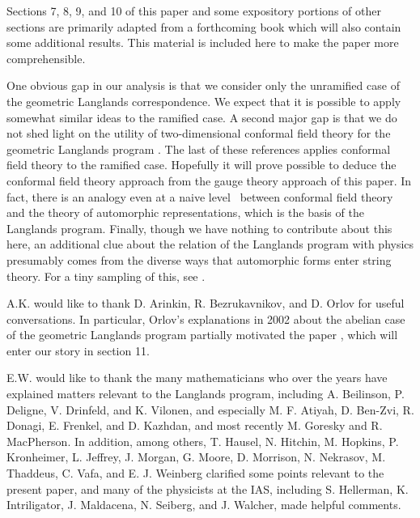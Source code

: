 Sections 7, 8, 9, and 10 of this paper and some expository
portions of other sections are primarily adapted from a
forthcoming book \cite{ref26} which will also contain
some additional results. This material is included here to make
the paper more comprehensible.

 
 

 

    

 
 
 One obvious gap in our analysis is
that we consider only the unramified case of the geometric
Langlands correspondence.  We expect that it is possible to apply
somewhat similar ideas to the ramified case.  A second major gap
is that we do not shed light on the utility of two-dimensional
conformal field theory for the geometric Langlands program
\cite{ref5,ref9,ref27,ref28,ref29,ref30}. The last of these
references applies conformal field theory to the ramified case.
Hopefully it will prove possible to deduce the conformal field
theory approach from the gauge theory approach of this paper. In
fact, there is an analogy even at a naive level \cite{ref31}\ between
conformal field theory and the theory of automorphic
representations, which is the basis of the Langlands program.
Finally, though we have nothing to contribute about this here, an
additional clue about the relation of the Langlands program with
physics presumably comes from the diverse ways that automorphic
forms enter string theory. For a tiny sampling of this, see
\cite{ref32,ref33,ref34,ref35,ref36,ref37,ref38,ref39,ref40}.

A.K. would like to thank D. Arinkin, R. Bezrukavnikov, and D.
Orlov for useful conversations. In particular, Orlov's
explanations in 2002 about the abelian case of the geometric
Langlands program partially motivated the paper \cite{ref41}, which will enter our story in section 11.

E.W. would like to thank the many mathematicians who over the
years have explained matters relevant to the Langlands program,
including A. Beilinson, P. Deligne,  V. Drinfeld,  and K. Vilonen,
and especially M. F. Atiyah,   D. Ben-Zvi, R. Donagi, E. Frenkel,
and D. Kazhdan, and most recently M. Goresky and R. MacPherson. In
addition, among others,  T. Hausel, N. Hitchin, M. Hopkins, P.
Kronheimer, L. Jeffrey,  J. Morgan, G. Moore, D. Morrison, N.
Nekrasov, M. Thaddeus, C. Vafa, and E. J. Weinberg clarified some
points relevant to the present paper, and many of the physicists
at the IAS, including S. Hellerman, K. Intriligator, J. Maldacena,
N. Seiberg, and J. Walcher, made helpful comments.
